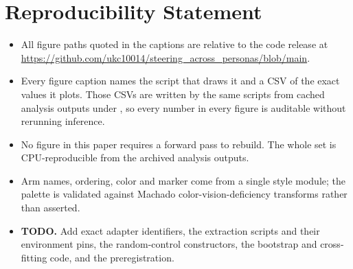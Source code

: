 \documentclass{article}
\newcommand{\provbase}{https://github.com/ukc10014/steering_across_personas/blob/main}
\begin{document}

\section*{Reproducibility Statement}
\label{sec:repro}
\begin{itemize}
    \item All figure paths quoted in the captions are relative to the code release at \url{\provbase}.
    \item Every figure caption names the script that draws it and a CSV of the exact values it plots. Those CSVs are written by the same scripts from cached analysis outputs under , so every number in every figure is auditable without rerunning inference.
    \item No figure in this paper requires a forward pass to rebuild. The whole set is CPU-reproducible from the archived analysis outputs.
    \item Arm names, ordering, color and marker come from a single style module; the palette is validated against Machado color-vision-deficiency transforms rather than asserted.
    \item \textbf{TODO.} Add exact adapter identifiers, the extraction scripts and their environment pins, the random-control constructors, the bootstrap and cross-fitting code, and the preregistration.
\end{itemize}
\end{document}
